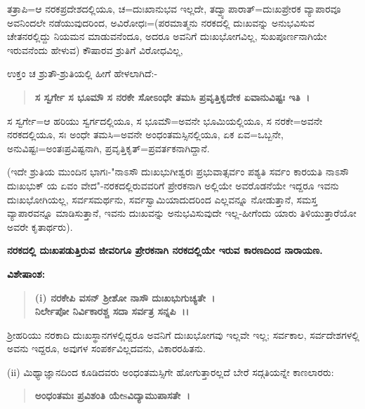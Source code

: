 ತತ್ರಾಪಿ=ಆ ನರಕಪ್ರದೇಶದಲ್ಲಿಯೂ, ಚ=ದುಃಖಾನುಭವ ಇಲ್ಲದೇ, ತದ್ವ್ಯಾಪಾ\-ರಾತ್=\-ದುಃಖಪ್ರೇರಕ ವ್ಯಾಪಾರವೂ ಅವನಿಂದಲೇ ನಡೆಯುವುದರಿಂದ, ಅವಿರೋಧಃ=(ಪರಮಾತ್ಮನು ನರಕದಲ್ಲಿ ದುಃಖವನ್ನು ಅನುಭವಿಸುವ ಚೇತನರಲ್ಲಿದ್ದು ನಿಯಮನ ಮಾಡುವನೆಂದೂ, ಅದರೂ ಅವನಿಗೆ ದುಃಖಭೋಗವಿಲ್ಲ, ಸುಖಪೂರ್ಣನಾಗಿಯೇ ಇರುವನೆಂದು ಹೇಳುವ) ಕೌಷಾರವ ಶ್ರುತಿಗೆ ವಿರೋಧವಿಲ್ಲ,

ಉಕ್ತಂ ಚ ಶ್ರುತೌ-ಶ್ರುತಿಯಲ್ಲಿ ಹೀಗೆ ಹೇಳಲಾಗಿದೆ:-

\begin{verse}
\textbf{ಸ ಸ್ವರ್ಗೇ ಸ ಭೂಮೌ ಸ ನರಕೇ ಸೋಽಂಧೇ ತಮಸಿ ಪ್ರವೃತ್ತಿಕೃದೇಕ ಏವಾನುವಿಷ್ಟಃ ಇತಿ~।}
\end{verse}


ಸ ಸ್ವರ್ಗೇ=ಆ ಹರಿಯು ಸ್ವರ್ಗದಲ್ಲಿಯೂ, ಸ ಭೂಮೌ=ಅವನೇ ಭೂಮಿಯಲ್ಲಿಯೂ, ಸ ನರಕೇ=ಅವನೇ ನರಕದಲ್ಲಿಯೂ, ಸಃ ಅಂಧೇ ತಮಸಿ=ಅವನೇ ಅಂಧಂತಮಸ್ಸಿನಲ್ಲಿಯೂ, ಏಕ ಏವ=ಒಬ್ಬನೇ, ಅನುವಿಷ್ಟಃ=ಅಂತಃಪ್ರವಿಷ್ಟನಾಗಿ, ಪ್ರವೃತ್ತಿಕೃತ್=ಪ್ರವರ್ತಕನಾಗಿದ್ದಾನೆ.

(ಇದೇ ಶ್ರುತಿಯ ಮುಂದಿನ ಭಾಗಃ-"ನಾಽಸೌ ದುಃಖಭುಗೀಶ್ವರಃ ಪ್ರಭುವಾತ್ಸರ್ವಂ ಪಶ್ಯತಿ ಸರ್ವಂ ಕಾರಯತಿ ನಾಽಸೌ ದುಃಖಭುಕ್ ಯ ಏವಂ ವೇದ"-ನರಕದಲ್ಲಿರುವವರಿಗೆ ಪ್ರೇರಕನಾಗಿ ಅಲ್ಲಿಯೇ ಅವರೊಡನೆಯೇ ಇದ್ದರೂ ಇವನು ದುಃಖಭೋಗಿಯಲ್ಲ, ಸರ್ವಸಮರ್ಥನು, ಸರ್ವಸ್ವಾಮಿಯಾದುದರಿಂದ ಎಲ್ಲವನ್ನೂ ನೋಡುತ್ತಾನೆ, ಸಮಸ್ತ ವ್ಯಾಪಾರವನ್ನೂ ಮಾಡಿಸುತ್ತಾನೆ, ಇವನು ದುಃಖವನ್ನು ಅನುಭವಿಸುವುದೇ ಇಲ್ಲ-ಹೀಗೆಂದು ಯಾರು ತಿಳಿಯುತ್ತಾರೆಯೋ ಅವರೇ ಕೃತಾರ್ಥರು).

\begin{center}
\textbf{ನರಕದಲ್ಲಿ ದುಃಖಪಡುತ್ತಿರುವ ಜೀವರಿಗೂ ಪ್ರೇರಕನಾಗಿ ನರಕದಲ್ಲಿಯೇ ಇರುವ ಕಾರಣದಿಂದ ನಾರಾಯಣ.}
\end{center}

\noindent
\textbf{ವಿಶೇಷಾಂಶ:\enginline{-}}

\begin{verse}
\textbf{(i) ನರಕೇಪಿ ವಸನ್ ಶ‍್ರೀಶೋ ನಾಸೌ ದುಃಖಭುಗುಚ್ಯತೇ~।}\\\textbf{ನಿರ್ಲೇಪೋ ನಿರ್ವಿಕಾರಶ್ಚ ಸದಾ ಸರ್ವತ್ರ ಸನ್ನಪಿ~।।}
\end{verse}


ಶ‍್ರೀಹರಿಯು ನರಕಾದಿ ದುಃಖಸ್ಥಾನಗಳಲ್ಲಿದ್ದರೂ ಅವನಿಗೆ ದುಃಖಭೋಗವು ಇಲ್ಲವೇ ಇಲ್ಲ; ಸರ್ವಕಾಲ, ಸರ್ವದೇಶಗಳಲ್ಲಿ ಅವನು ಇದ್ದರೂ, ಅವುಗಳ ಸಂಪರ್ಕವಿಲ್ಲದವನು, ವಿಕಾರರಹಿತನು.

(ii) ಮಿಥ್ಯಾಜ್ಞಾನದಿಂದ ಕೂಡಿದವರು ಅಂಧಂತಮಸ್ಸಿಗೇ ಹೋಗುತ್ತಾರಲ್ಲದೆ ಬೇರೆ ಸದ್ಗತಿ\-ಯನ್ನೇ ಕಾಣಲಾರರು:

\newpage

\begin{verse}
\textbf{ಅಂಧಂತಮಃ ಪ್ರವಿಶಂತಿ ಯೇsವಿದ್ಯಾಮುಪಾಸತೇ~।}
\end{verse}


